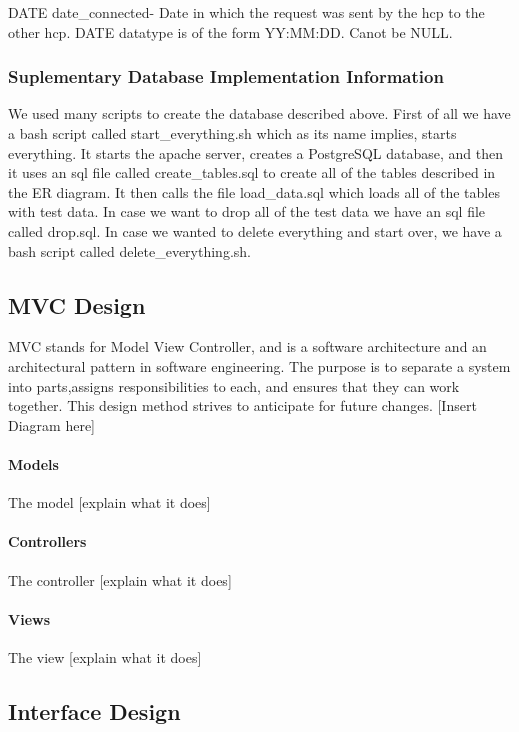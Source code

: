 \documentclass[12pt]{report}
\begin{document}
DATE date\_connected- Date in which the request was sent by the hcp to the other hcp.  DATE datatype is of the form YY:MM:DD.  Canot be NULL.\\

\subsubsection{Suplementary Database Implementation Information}
We used many scripts to create the database described above.  First of all we have a bash script called start\_everything.sh which as its name implies, starts everything.  It starts the apache server, creates a PostgreSQL database, and then it uses an sql file called create\_tables.sql to create all of the tables described in the ER diagram.  It then calls the file load\_data.sql which loads all of the tables with test data.  In case we want to drop all of the test data we have an sql file called drop.sql.  In case we wanted to delete everything and start over, we have a bash script called delete\_everything.sh.     

\subsection{MVC Design}

MVC stands for Model View Controller, and is a software architecture and an architectural pattern in software engineering. The purpose is to separate a system into parts,assigns responsibilities to each, and ensures that they can work together. This design method strives to anticipate for future changes. 
[Insert Diagram here]
\paragraph{Models}
The model [explain what it does]

\paragraph{Controllers}
The controller [explain what it does]

\paragraph{Views}
The view [explain what it does]

\subsection{Interface Design}
\end{document}
